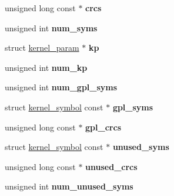 \begin{DoxyCompactItemize}
\item 
\hypertarget{structmodule_a89fb8c695be728b27c86f5d08e385108}{}unsigned long const $\ast$ {\bfseries crcs}\label{structmodule_a89fb8c695be728b27c86f5d08e385108}

\item 
\hypertarget{structmodule_a4a000b3ad9f1843b3bfad70ebf2e893f}{}unsigned int {\bfseries num\+\_\+syms}\label{structmodule_a4a000b3ad9f1843b3bfad70ebf2e893f}

\item 
\hypertarget{structmodule_af65fa097b9bd515b3195de5aff88a5ec}{}struct \hyperlink{structkernel__param}{kernel\+\_\+param} $\ast$ {\bfseries kp}\label{structmodule_af65fa097b9bd515b3195de5aff88a5ec}

\item 
\hypertarget{structmodule_aaadae6d3d48c0947a74f6b381f5e5443}{}unsigned int {\bfseries num\+\_\+kp}\label{structmodule_aaadae6d3d48c0947a74f6b381f5e5443}

\item 
\hypertarget{structmodule_a8598072484028c679737e257bea64476}{}unsigned int {\bfseries num\+\_\+gpl\+\_\+syms}\label{structmodule_a8598072484028c679737e257bea64476}

\item 
\hypertarget{structmodule_aa3793da91a5a6fb31cd86432f867334a}{}struct \hyperlink{structkernel__symbol}{kernel\+\_\+symbol} const $\ast$ {\bfseries gpl\+\_\+syms}\label{structmodule_aa3793da91a5a6fb31cd86432f867334a}

\item 
\hypertarget{structmodule_a57901652b423a2ed3d6c3247b6f02a33}{}unsigned long const $\ast$ {\bfseries gpl\+\_\+crcs}\label{structmodule_a57901652b423a2ed3d6c3247b6f02a33}

\item 
\hypertarget{structmodule_a7feaa11a37ab0d44bc4ff6fda9beadec}{}struct \hyperlink{structkernel__symbol}{kernel\+\_\+symbol} const $\ast$ {\bfseries unused\+\_\+syms}\label{structmodule_a7feaa11a37ab0d44bc4ff6fda9beadec}

\item 
\hypertarget{structmodule_a547dc241a851796d9c0215600078b265}{}unsigned long const $\ast$ {\bfseries unused\+\_\+crcs}\label{structmodule_a547dc241a851796d9c0215600078b265}

\item 
\hypertarget{structmodule_ad42e50347ea080f5987a9ca81b429904}{}unsigned int {\bfseries num\+\_\+unused\+\_\+syms}\label{structmodule_ad42e50347ea080f5987a9ca81b429904}


\end{DoxyCompactItemize}
